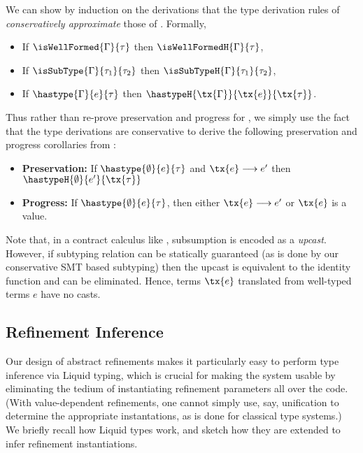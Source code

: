 We can show by induction on the derivations that the 
type derivation rules of \corelan \emph{conservatively approximate}
those of \conlan. Formally, 

\begin{itemize}
\item If $\isWellFormed{\Gamma}{\tau}$ then $\isWellFormedH{\Gamma}{\tau}$,
\item If $\isSubType{\Gamma}{\tau_1}{\tau_2}$ then $\isSubTypeH{\Gamma}{\tau_1}{\tau_2}$,
\item If $\hastype{\Gamma}{e}{\tau}$ then
$\hastypeH{\tx{\Gamma}}{\tx{e}}{\tx{\tau}}$.
\end{itemize}

 Thus rather than re-prove preservation and progress
for \corelan, we simply use the fact that the type derivations are
conservative to derive the following preservation and progress 
corollaries from \cite{Greenberg11}:
%
\begin{itemize}
\item{\textbf{Preservation: }} 
  If $\hastype{\emptyset}{e}{\tau}$ 
  and $\tx{e} \longrightarrow e'$ 
  then $\hastypeH{\emptyset}{e'}{\tx{\tau}}$

\item{\textbf{Progress: }}
  If $\hastype{\emptyset}{e}{\tau}$, then either
  $\tx{e} \longrightarrow e'$ or 
  $\tx{e}$ is a value.
\end{itemize}
%
Note that, in a contract calculus like \conlan, subsumption is encoded
as a \emph{upcast}. However, if subtyping relation can be statically 
guaranteed (as is done by our conservative SMT based subtyping) 
then the upcast is equivalent to the identity function and can 
be eliminated. Hence, \conlan terms $\tx{e}$ translated from well-typed 
\corelan terms $e$ have no casts.

\subsection{Refinement Inference}\label{sec:infer}

Our design of abstract refinements makes it particularly easy to 
perform type inference via Liquid typing, which is crucial for
making the system usable by eliminating the tedium of instantiating 
refinement parameters all over the code. (With value-dependent 
refinements, one cannot simply use, say, unification to determine
the appropriate instantations, as is done for classical type systems.)
We briefly recall how Liquid types work, and sketch how they are 
extended to infer refinement instantiations.

